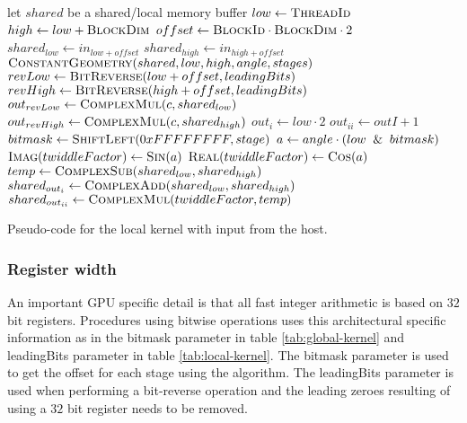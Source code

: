 \begin{algorithm}
	\centering
	\begin{algorithmic}[1]
            \State let $shared$ be a shared/local memory buffer     
            \State $low  \gets \Call{ThreadId}{}$
            \State $high \gets low + \Call{BlockDim}{}$   
            \State $offset \gets \Call{BlockId}{} \cdot \Call{BlockDim}{} \cdot 2$
            \State $shared_{low}  \gets in_{low + offset}$
            \State $shared_{high} \gets in_{high + offset}$
            \State $\Call{ConstantGeometry}{shared, low, high, angle, stages}$
            \State $revLow  \gets \Call{BitReverse}{low + offset, leadingBits}$
            \State $revHigh \gets \Call{BitReverse}{high + offset, leadingBits}$
            \State $out_{revLow}  \gets \Call{ComplexMul}{c, shared_{low}}$
            \State $out_{revHigh} \gets \Call{ComplexMul}{c, shared_{high}}$
        \EndProcedure
        \Statex
            \State $out_{i} \gets low \cdot 2$
            \State $out_{ii} \gets outI + 1$
            	\State $bitmask \gets \Call{ShiftLeft}{0xFFFFFFFF, stage}$
            	\State $a \gets angle \cdot (low \And bitmask)$
            	\State $\Call{Imag}{twiddleFactor} \gets \Call{Sin}{a}$
            	\State $\Call{Real}{twiddleFactor} \gets \Call{Cos}{a}$
				\State $temp \gets \Call{ComplexSub}{shared_{low}, shared_{high}}$
				\State $shared_{out_{i}} \gets \Call{ComplexAdd}{shared_{low}, shared_{high}}$
				\State $shared_{out_{ii}} \gets \Call{ComplexMul}{twiddleFactor, temp}$
			\EndFor
        \EndProcedure
	\end{algorithmic}
	\caption{Pseudo-code for the local kernel with input from the host.}
	\label{alg:device:local-kernel}
\end{algorithm}

\subsubsection{Register width}

An important \gls{GPU} specific detail is that all fast integer arithmetic is based on $32$ bit registers. Procedures using bitwise operations uses this architectural specific information as in the bitmask parameter in table \ref{tab:global-kernel} and leadingBits parameter in table \ref{tab:local-kernel}. The bitmask parameter is used to get the offset for each stage using the {\CTALG} algorithm. The leadingBits parameter is used when performing a bit-reverse operation and the leading zeroes resulting of using a $32$ bit register needs to be removed.


